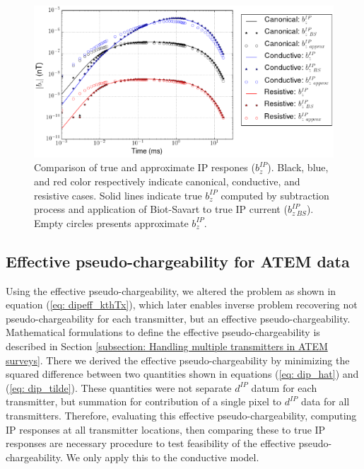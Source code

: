 \documentclass[a4paper, 11pt]{article}
\newcommand{\dip}{d^{IP}}
\begin{document}
\begin{figure}[htb]
  \centering
  \includegraphics[width=1\textwidth]{figures/True_vs_approx_IPresp.png}
  \caption{Comparison of true and approximate IP respones ($b_z^{IP}$). Black, blue, and red color respectively indicate canonical, conductive, and resistive cases. Solid lines indicate true $b_z^{IP}$ computed by subtraction process and application of Biot-Savart to true IP current ($b_{z \ BS}^{IP}$). Empty circles presents approximate $b_z^{IP}$. }
  \label{F:True_vs_approx_IPresp}
\end{figure}
\clearpage


\subsection{Effective pseudo-chargeability for ATEM data}
\label{subsection: Effective pseudo-chargeability for ATEM data}
Using the effective pseudo-chargeability, we altered the problem as shown in equation (\ref{eq: dipeff_kthTx}), which later enables inverse problem recovering not pseudo-chargeability for each transmitter, but an effective pseudo-chargeability. Mathematical formulations to define the effective pseudo-chargeability is described in Section \ref{subsection: Handling multiple transmitters in ATEM surveys}. There we derived the effective pseudo-chargeability by minimizing the squared difference between two quantities shown in equations (\ref{eq: dip_hat}) and (\ref{eq: dip_tilde}). These quantities were not separate $\dip$ datum for each transmitter, but summation for contribution of a single pixel to $\dip$ data for all transmitters. 
Therefore, evaluating this effective pseudo-chargeability, computing IP responses at all transmitter locations, then comparing these to true IP responses are necessary procedure to test feasibility of the effective pseudo-chargeability. 
We only apply this to the conductive model. 
\end{document}
